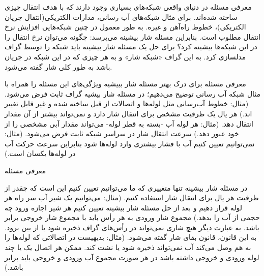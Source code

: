 \begin{itemframe}{معرفی مسئله}
\itm
در دنیای واقعی شبکه‌های بسیاری وجود دارند که با هدف انتقال چیزی ساخته شده‌اند. برای مثال شبکه‌های آب رسانی، مدارات الکتریکی(انتقال جریان الکتریکی)، خطوط راه‌آهن و غیره. به طور معمول در چنین شبکه‌هایی افزایش نرخ انتقال مطلوب است. بنابراین مسئله شار بیشینه می‌پرسد‌: چگونه می‌توان نرخ انتقال را در این شبکه‌ها بیشینه کرد؟
\itm
برای حل یک مسئله شار بیشینه باید شبکه را توسط گراف مدلسازی کرد. به این گراف «شبکه شار»
و به هر چیزی که در این شبکه در جریان باشد به طور کلی شار
 گفته می‌شود.
\end{itemframe}

\begin{itemframe}{معرفی مسئله}
\itm
برای درک بهتر مسئله شار بییشیه ويژگی‌های این مسئله را همراه با مثال شبکه آب رسانی توضیح می‌دهیم؛
\itm
در مسئله شار بیشیه گراف ثابت فرض می‌شود. (مثال: خطوط آب‌رسانی مثل لوله‌ها و اتصالات از قبل ساخته شده‌ و غیر قابل تغییر اند.)
\itm
هر یال یک ظرفیت مشخص برای انتقال شار دارد و نمی‌تواند بیشتر از آن مقدار انتقال دهد. (مثال: هر لوله آب -بسته به قطر لوله‌- می‌تواند مقدار آبی مشخصی را از خود عبور دهد.)
\itm
سرعت انتقال شار در سراسر شبکه ثابت فرض می‌شود. (مثال: نمی‌توانیم تعیین کنیم آب با فشار بیشتری وارد لوله‌ها شود بنابراین سرعت حرکت آب در لوله‌ها یکسان است.)
\end{itemframe}

\begin{itemframe}{معرفی مسئله}

\itm
در مسئله شار بیشینه تنها متغییری که ما می‌توانیم تعیین کنیم این است که چقدر از ظرفیت هر یال برای انتقال شار استفاده کنیم. (مثال: می‌توانیم یک شیر آب سر راه هر لوله قرار دهیم و بعد از حل مسئله شار بیشینه تعیین کنیم هر شیر اجازه ورود چه حجمی از آب را بدهد.)
\itm
مجموع شار ورودی به هر رأس باید با مجموع شار خروجی برابر باشد. به عبارت دیگر هیچ شاری نمی‌تواند در رأس‌های گراف ذخیره شود یا از بین برود. به این قانون، قانون بقای شار
گفته می‌شود.
(مثال: بدیهیست در اتصالاتی که لوله‌ها را به هم وصل می‌کند آب نمی‌تواند ذخیره شود یا نشت کند. ممکن هر اتصال یک یا چند لوله ورودی و خروجی داشته باشد در هر صورت مجموع آب ورودی و خروجی باید برابر باشد.)

\end{itemframe}

